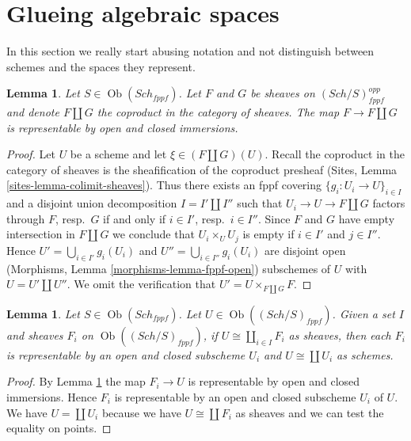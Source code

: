 \documentclass{stacks-project}
\theoremstyle{plain}
\newtheorem{lemma}[subsection]{Lemma}
\theoremstyle{definition}
\theoremstyle{remark}
\numberwithin{equation}{subsection}
\def\Sch{\mathit{Sch}}
\def\Ob{\mathop{\mathrm{Ob}}\nolimits}
\begin{document}
\section{Glueing algebraic spaces}
\label{section-glueing-algebraic-spaces}

\noindent
In this section we really start abusing notation and not
distinguish between schemes and the spaces they represent.

\begin{lemma}
\label{lemma-coproduct-sheaves-open-and-closed}
Let $S \in \Ob(\Sch_{fppf})$. Let $F$ and $G$ be sheaves on
$(\Sch/S)_{fppf}^{opp}$ and denote $F \amalg G$ the coproduct
in the category of sheaves. The map $F \to F \amalg G$ is representable by
open and closed immersions.
\end{lemma}

\begin{proof}
Let $U$ be a scheme and let $\xi \in (F \amalg G)(U)$. Recall the
coproduct in the category of sheaves is the sheafification of
the coproduct presheaf (Sites, Lemma \ref{sites-lemma-colimit-sheaves}).
Thus there exists an fppf covering $\{g_i : U_i \to U\}_{i \in I}$
and a disjoint union decomposition $I = I' \amalg I''$ such that
$U_i \to U \to F \amalg G$ factors through $F$, resp.\ $G$
if and only if $i \in I'$, resp.\ $i \in I''$. Since $F$ and
$G$ have empty intersection in $F \amalg G$ we conclude that
$U_i \times_U U_j$ is empty if $i \in I'$ and $j \in I''$.
Hence $U' = \bigcup_{i \in I'} g_i(U_i)$ and
$U'' = \bigcup_{i \in I''} g_i(U_i)$ are disjoint open
(Morphisms, Lemma \ref{morphisms-lemma-fppf-open}) subschemes of $U$
with $U = U' \amalg U''$.
We omit the verification that $U' = U \times_{F \amalg G} F$.
\end{proof}

\begin{lemma}
\label{lemma-representable-sheaf-coproduct-sheaves}
Let $S \in \Ob(\Sch_{fppf})$.
Let $U \in \Ob((\Sch/S)_{fppf})$.
Given a set $I$ and sheaves $F_i$ on $\Ob((\Sch/S)_{fppf})$,
if $U \cong \coprod_{i\in I} F_i$
as sheaves, then each $F_i$ is representable by an open and closed
subscheme $U_i$ and $U \cong \coprod U_i$ as schemes.
\end{lemma}

\begin{proof}
By Lemma \ref{lemma-coproduct-sheaves-open-and-closed}
the map $F_i \to U$ is representable by open and closed immersions.
Hence $F_i$ is representable by an open and closed subscheme $U_i$ of $U$.
We have $U = \coprod U_i$ because we have $U \cong \coprod F_i$
as sheaves and we can test the equality on points.
\end{proof}
\end{document}
